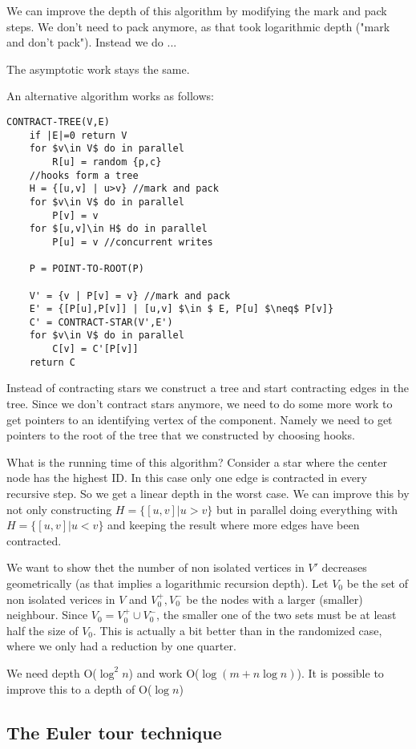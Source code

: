 We can improve the depth of this algorithm by modifying the mark and pack steps. We don't need to pack anymore, as that took logarithmic depth ("mark and don't pack"). Instead we do ...

The asymptotic work stays the same.

An alternative algorithm works as follows:

\begin{lstlisting}
CONTRACT-TREE(V,E)
	if |E|=0 return V
	for $v\in V$ do in parallel
		R[u] = random {p,c}
	//hooks form a tree
	H = {[u,v] | u>v} //mark and pack
	for $v\in V$ do in parallel
		P[v] = v
	for $[u,v]\in H$ do in parallel
		P[u] = v //concurrent writes
	
	P = POINT-TO-ROOT(P)	
	
	V' = {v | P[v] = v} //mark and pack
	E' = {[P[u],P[v]] | [u,v] $\in $ E, P[u] $\neq$ P[v]}
	C' = CONTRACT-STAR(V',E')
	for $v\in V$ do in parallel
		C[v] = C'[P[v]]
	return C	
\end{lstlisting}

Instead of contracting stars we construct a tree and start contracting edges in the tree. Since we don't contract stars anymore, we need to do some more work to get pointers to an identifying vertex of the component. Namely we need to get pointers to the root of the tree that we constructed by choosing hooks.

What is the running time of this algorithm? Consider a star where the center node has the highest ID. In this case only one edge is contracted in every recursive step. So we get a linear depth in the worst case. We can improve this by not only constructing $H = \{[u,v] | u>v\}$ but in parallel doing everything with $H = \{[u,v] | u<v\}$ and keeping the result where more edges have been contracted.

We want to show thet the number of non isolated vertices in $V'$ decreases geometrically (as that implies a logarithmic recursion depth). Let $V_0$ be the set of non isolated verices in $V$ and $V_0^+, V_0^-$ be the nodes with a larger (smaller) neighbour. Since $V_0= V_0^+\cup V_0^-$, the smaller one of the two sets must be at least half the size of $V_0$. This is actually a bit better than in the randomized case, where we only had a reduction by one quarter.

We need depth O($\log^2n$) and work O($\log(m+n\log n)$). It is possible to improve this to a depth of O($\log n$)

\subsection{The Euler tour technique}

